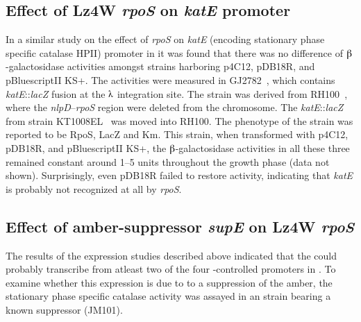 \subsection{Effect of Lz4W \emph{rpoS} on \emph{katE}
promoter} \label{chap5:kate}

In a similar study on the effect of \emph{rpoS} on
\emph{katE} (encoding stationary phase specific catalase HPII)
promoter in  it was found that there was no difference of
$\betaup$-galactosidase activities amongst strains harboring
p4C12, pDB18R, and pBluescriptII KS+. The activities were measured
in GJ2782~\citep[kind gift from J Gowrishankar]{Rajkumari2002},
which contains \emph{katE}::\emph{lacZ} fusion at the $\lambdaup$
integration site. The strain was derived from
RH100~\citep{Hengge1993}, where the \emph{nlpD}--\emph{rpoS}
region were deleted from the chromosome. The
\emph{katE}::\emph{lacZ} from strain KT1008EL~\citep{Tanaka1997}
was moved into RH100. The phenotype of the strain was reported to
be RpoS\su{$-$}, LacZ\su{$-$} and Km. This strain, when
transformed with p4C12, pDB18R, and pBluescriptII KS+, the
$\betaup$-galactosidase activities in all these three remained
constant around 1--5 units throughout the growth phase (data not
shown). Surprisingly, even pDB18R failed to restore activity,
indicating that \emph{katE} is probably not recognized at all by
 \emph{rpoS}.

\subsection{Effect of amber-suppressor \emph{supE} on Lz4W \emph{rpoS}}

The results of the  expression studies described above
indicated that the \lzsig{} could probably transcribe from atleast
two of the four \sigs{}-controlled promoters in . To
examine whether this expression is due to to a suppression of the
amber, the stationary phase specific catalase activity was assayed
in an  strain bearing a known suppressor (JM101).


